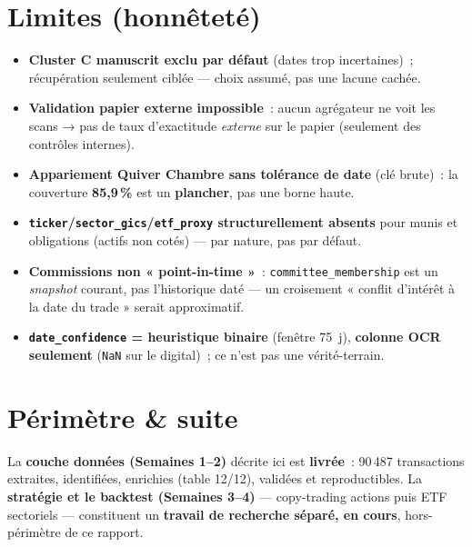 \documentclass[11pt,a4paper]{article}
\newcommand{\co}[1]{\texttt{\small #1}}
\begin{document}
\section{Limites (honnêteté)}
\label{sec:limites}

\begin{itemize}[nosep,leftmargin=1.5em]
\item \textbf{Cluster C manuscrit exclu par défaut} (dates trop incertaines)~; récupération seulement
ciblée — choix assumé, pas une lacune cachée.
\item \textbf{Validation papier externe impossible}~: aucun agrégateur ne voit les scans → pas de taux
d'exactitude \emph{externe} sur le papier (seulement des contrôles internes).
\item \textbf{Appariement Quiver Chambre sans tolérance de date} (clé brute)~: la couverture
\textbf{85,9\,\%} est un \textbf{plancher}, pas une borne haute.
\item \textbf{\co{ticker}/\co{sector_gics}/\co{etf_proxy} structurellement absents} pour munis et
obligations (actifs non cotés) — par nature, pas par défaut.
\item \textbf{Commissions non « point-in-time »}~: \co{committee_membership} est un \emph{snapshot}
courant, pas l'historique daté — un croisement « conflit d'intérêt à la date du trade » serait
approximatif.
\item \textbf{\co{date_confidence} = heuristique binaire} (fenêtre 75~j), \textbf{colonne OCR seulement}
(\co{NaN} sur le digital)~; ce n'est pas une vérité-terrain.
\end{itemize}

\section{Périmètre \& suite}
La \textbf{couche données (Semaines 1--2)} décrite ici est \textbf{livrée}~: 90\,487 transactions
extraites, identifiées, enrichies (table 12/12), validées et reproductibles. La \textbf{stratégie et le
backtest (Semaines 3--4)} — copy-trading actions puis ETF sectoriels — constituent un \textbf{travail de
recherche séparé, en cours}, hors-périmètre de ce rapport.

\end{document}
